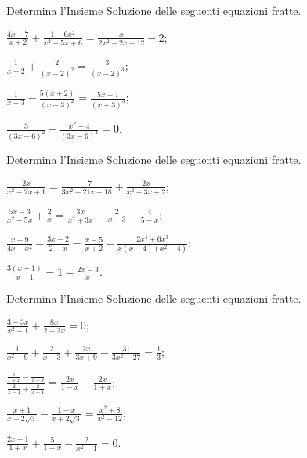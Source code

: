 \begin{esercizio}[\Ast]
 \label{ese:3.45}
Determina l'Insieme Soluzione delle seguenti equazioni fratte.
\begin{multicols}{2}
\begin{enumeratea}
\item $\frac{4 x-7}{x + 2} + \frac{1-6 x^{2}}{x^{2}-5 x + 6} =\frac{x}{2 x^{2}-2 x-12}-2$;
\item $\frac{1}{x-2} + \frac{2}{(x-2)^{2}} = \frac{3}{(x-2)^{3}}$;
\item $\frac{1}{x + 3}-\frac{5 (x + 2)}{(x + 3)^{2}} = \frac{5 x- 1}{(x + 3)^{3}}$;
\item $\frac{3}{(3 x-6)^{2}}-\frac{x^{2}-4}{(3 x-6)^{4}} = 0$.
\end{enumeratea}
\end{multicols}
\end{esercizio}

\begin{esercizio}[\Ast]
 \label{ese:3.46}
Determina l'Insieme Soluzione delle seguenti equazioni fratte.
\begin{multicols}{2}
\begin{enumeratea}
\item $\frac{2 x}{x^{2}-2 x + 1} = \frac{- 7}{3 x^{2}-21 x + 18}+ \frac{2 x}{x^{2}-3 x + 2}$;
\item $\frac{5 x-3}{x^{2}-5 x} + \frac{2}{x} = \frac{3 x}{x^{2}+ 3 x}-\frac{2}{x + 3}-\frac{4}{5-x}$;
\item $\frac{x-9}{4 x-x^{2}}-\frac{3 x + 2}{2-x} = \frac{x-5}{x + 2} + \frac{2 x^{4} + 6 x^{3}}{x (x-4) (x^{2}-4)}$;
\item $\frac{3 (x + 1)}{x-1}=1-\frac{2 x-3}{x}$.
\end{enumeratea}
\end{multicols}
\end{esercizio}
\newpage
\begin{esercizio}[\Ast]
 \label{ese:3.47}
Determina l'Insieme Soluzione delle seguenti equazioni fratte.
\begin{multicols}{2}
\begin{enumeratea}
\item $\frac{3-3 x}{x^{2}-1} + \frac{8 x}{2-2 x} = 0$;
\item $\frac{1}{x^{2}-9} + \frac{2}{x-3} + \frac{2 x}{3 x + 9} -\frac{31}{3 x^{2}-27} = \frac{1}{3}$;
\item $\frac{\frac{1}{1 + x}-\frac{1}{1-x}}{\frac{2}{x-1} +\frac{2}{x + 1}} = \frac{2 x}{1-x}-\frac{2 x}{1 + x}$;
\item $\frac{x + 1}{x-2 \sqrt{3}}-\frac{1-x}{x + 2 \sqrt{3}} =\frac{x^{2} + 8}{x^{2}-12}$;
\item $\frac{2 x + 1}{1 + x} + \frac{5}{1-x}-\frac{2}{x^{2}-1}= 0$.
\end{enumeratea}
\end{multicols}
\end{esercizio}

